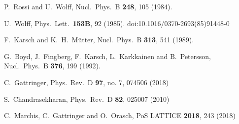 \documentclass{PoS}
\begin{document}
\begin{thebibliography}{99}

  P.~Rossi and U.~Wolff,
  Nucl.\ Phys.\ B {\bf 248}, 105 (1984).
  
  U.~Wolff,
  Phys.\ Lett.\  {\bf 153B}, 92 (1985).
  doi:10.1016/0370-2693(85)91448-0

  F.~Karsch and K.~H.~M\"utter,
  Nucl.\ Phys.\ B {\bf 313}, 541 (1989).

  G.~Boyd, J.~Fingberg, F.~Karsch, L.~Karkkainen and B.~Petersson,
  Nucl.\ Phys.\ B {\bf 376}, 199 (1992).
  
  C.~Gattringer,
  Phys.\ Rev.\ D {\bf 97}, no. 7, 074506 (2018)
  
  S.~Chandrasekharan,
  Phys.\ Rev.\ D {\bf 82}, 025007 (2010)
  
  C.~Marchis, C.~Gattringer and O.~Orasch,
  PoS LATTICE {\bf 2018}, 243 (2018)
  

\end{thebibliography}
\end{document}
